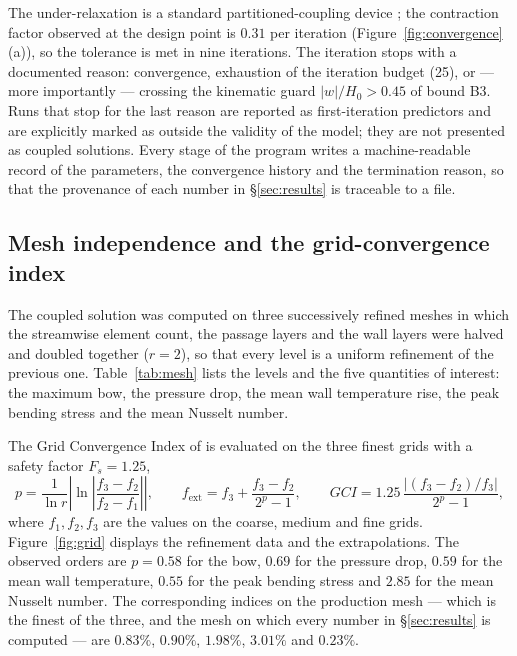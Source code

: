 \documentclass[11pt,a4paper]{article}
\newcommand{\tabinput}[1]{%
  \IfFileExists{tables/#1}{}{}}
\begin{document}
The under-relaxation is a standard partitioned-coupling device
\citep{felippa2001partitioned}; the contraction factor observed at the design
point is $0.31$ per iteration (Figure~\ref{fig:convergence}(a)), so the
tolerance is met in nine iterations. The iteration stops with a documented
reason: convergence, exhaustion of the iteration budget (25), or --- more
importantly --- crossing the kinematic guard $|w|/H_0>0.45$ of bound B3.
Runs that stop for the last reason are reported as first-iteration predictors
and are explicitly marked as outside the validity of the model; they are not
presented as coupled solutions. Every stage of the program writes a
machine-readable record of the parameters, the convergence history and the
termination reason, so that the provenance of each number in
\S\ref{sec:results} is traceable to a file.


\subsection{Mesh independence and the grid-convergence index}
\label{sec:grid}

The coupled solution was computed on three successively refined meshes in
which the streamwise element count, the passage layers and the wall layers
were halved and doubled together ($r=2$), so that every level is a uniform
refinement of the previous one. Table~\ref{tab:mesh} lists the levels and the
five quantities of interest: the maximum bow, the pressure drop, the mean wall
temperature rise, the peak bending stress and the mean Nusselt number.

\tabinput{table_mesh.tex}

The Grid Convergence Index of \citet{roache1994perspective} is evaluated on
the three finest grids with a safety factor $F_s=1.25$,
\begin{equation}
p=\frac{1}{\ln r}\left|\ln\left|\frac{f_3-f_2}{f_2-f_1}\right|\right|,
\qquad
f_{\mathrm{ext}}=f_3+\frac{f_3-f_2}{2^{p}-1},
\qquad
GCI=1.25\,\frac{|(f_3-f_2)/f_3|}{2^{p}-1},
\label{eq:gci}
\end{equation}
where $f_1,f_2,f_3$ are the values on the coarse, medium and fine grids.
Figure~\ref{fig:grid} displays the refinement data and the extrapolations.
The observed orders are $p=0.58$ for the bow, $0.69$ for the pressure drop, $0.59$
for the mean wall temperature, $0.55$ for the peak bending stress and $2.85$
for the mean Nusselt number. The corresponding indices on the production mesh
--- which is the finest of the three, and the mesh on which every number in
\S\ref{sec:results} is computed --- are $0.83\%$, $0.90\%$, $1.98\%$, $3.01\%$
and $0.23\%$.
\end{document}

